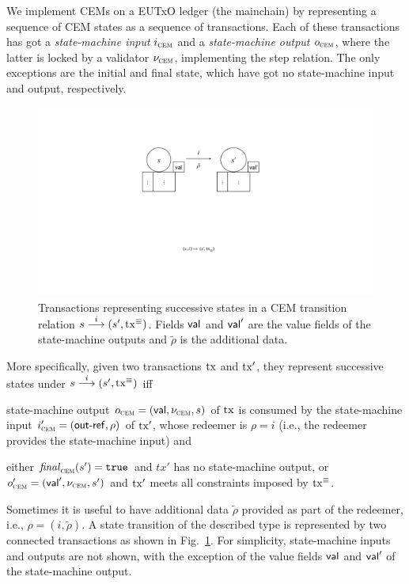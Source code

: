 We implement CEMs on a EUTxO ledger (the mainchain) by representing a sequence of CEM states as a sequence of transactions. Each of these transactions has got a \emph{state-machine input} $i_{\textsc{cem}}$ and a \emph{state-machine output} $o_{\textsc{cem}}$, where the latter is locked by a validator $\nu_{\textsc{cem}}$, implementing the step relation. The only exceptions are the initial and final state, which have got no state-machine input and output, respectively.

\begin{figure}[t]
  \centering
  \includegraphics[scale=.2,width=\textwidth/2]{figures/state-transition_cropped.pdf}
  \caption{Transactions representing successive states in a CEM
    transition relation \({s}\overset{i}\longrightarrow(s', \mathrm{tx}^\equiv)\).  Fields
    $\mathsf{val}$ and $\mathsf{val}'$ are the value fields of the state-machine
    outputs and $\tilde \rho$ is the additional data.}
  \label{fig:state-transition}
\end{figure}

More specifically, given two transactions $\mathrm{tx}$ and $\mathrm{tx}'$, they represent successive states under \({s}\overset{i}\longrightarrow(s', \mathrm{tx}^\equiv)\) iff 
%
\begin{mitemize}
  \item state-machine output $o_{\textsc{cem}} = (\mathsf{val}, \nu_{\textsc{cem}}, s)$ of $\mathrm{tx}$
  is consumed by the state-machine input $i_{\textsc{cem}}' = (\mathsf{out\textsf{-}{}ref}, \rho)$
  of $\mathrm{tx}'$, whose redeemer is \(\rho = i\) (i.e., the redeemer
  provides the state-machine input) and
  \item either $\mathit{final}_{\textsc{cem}}(s') = \mathtt{true}$ and $tx'$ has no state-machine
  output, or $o_{\textsc{cem}}' = (\mathsf{val}', \nu_{\textsc{cem}}, s')$ and $\mathrm{tx}'$ meets all
  constraints imposed by $\mathrm{tx}^\equiv$.
\end{mitemize}
Sometimes it is useful to have additional data $\tilde \rho$ provided
as part of the redeemer, i.e., $\rho = (i,\tilde \rho)$.
%
A state transition of the described type is represented by two connected
transactions as shown in Fig.~\ref{fig:state-transition}.  For
simplicity, state-machine inputs and outputs are not shown, with the
exception of the value fields $\mathsf{val}$ and $\mathsf{val}'$ of the state-machine output.


